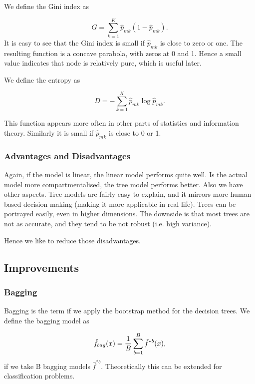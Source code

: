 \documentclass{article}
\begin{document}
We define the Gini index as 

\begin{equation}\label{Gini_index}
    G= \sum_{k=1}^K \hat{p}_{mk} (1-\hat{p}_{mk}).
\end{equation}
It is easy to see that the Gini index is small if $\hat{p}_{mk}$ is close to zero or one. The resulting function is a concave parabola, with zeros at 0 and 1. Hence a small value indicates that node is relatively pure, which is useful later. 

We define the entropy as

\begin{equation}\label{entropy_tree}
    D=-\sum_{k=1}^K \hat{p}_{mk} \log \hat{p}_{mk}.
\end{equation}

This function appears more often in other parts of statistics and information theory. Similarly it is small if $\hat{p}_{mk}$ is close to 0 or 1. 

\subsubsection{Advantages and Disadvantages}

Again, if the model is linear, the linear model performs quite well. Is the actual model more compartmentalised, the tree model performs better. Also we have other aspects. Tree models are fairly easy to explain, and it mirrors more human based decision making (making it more applicable in real life). Trees can be portrayed easily, even in higher dimensions. The downside is that most trees are not as accurate, and they tend to be not robust (i.e. high variance). 

Hence we like to reduce those disadvantages.

\subsection{Improvements}
\subsubsection{Bagging}

Bagging is the term if we apply the bootstrap method for the decision trees. We define the bagging model as 


\begin{equation}
    \Hat{f}_{bag}(x)= \frac{1}{B} \sum_{b=1}^B \hat{f}^{*b}(x),
\end{equation}
if we take B bagging models $\hat{f}^{*b}$. Theoretically this can be extended for classification problems.
\end{document}
